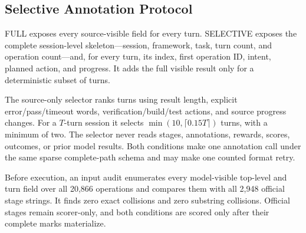 \documentclass[letterpaper]{article}
\begin{document}
\subsection{Selective Annotation Protocol}
\label{app:selective}

FULL exposes every source-visible field for every turn. SELECTIVE exposes the
complete session-level skeleton---session, framework, task, turn count, and
operation count---and, for every turn, its index, first operation ID, intent,
planned action, and progress. It adds the full visible result only for a
deterministic subset of turns.

The source-only selector ranks turns using result length, explicit
error/pass/timeout words, verification/build/test actions, and source progress
changes. For a $T$-turn session it selects
$\min(10,\lceil0.15T\rceil)$ turns, with a minimum of two. The selector never
reads stages, annotations, rewards, scores, outcomes, or prior model results.
Both conditions make one annotation call under the same sparse complete-path
schema and may make one counted format retry.

Before execution, an input audit enumerates every model-visible top-level and
turn field over all 20{,}866 operations and compares them with all 2{,}948
official stage strings. It finds zero exact collisions and zero substring
collisions. Official stages remain scorer-only, and both conditions are scored
only after their complete marks materialize.
\end{document}
